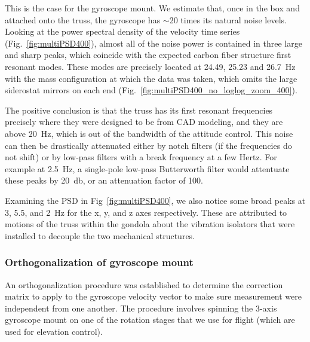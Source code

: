 This is the case for the gyroscope mount. We estimate that, once in the box and attached onto the truss, the gyroscope has $\sim$20 times its natural noise levels. Looking at the power spectral density of the velocity time series (Fig.~\ref{fig:multiPSD400}), almost all of the noise power is contained in three large and sharp peaks, which coincide with the expected carbon fiber structure first resonant modes. These modes are precisely located at 24.49, 25.23 and \SI{26.7}{\hertz} with the mass configuration at which the data was taken, which omits the large siderostat mirrors on each end (Fig.~\ref{fig:multiPSD400_no_loglog_zoom_400}).

The positive conclusion is that the truss has its first resonant frequencies precisely where they were designed to be from CAD modeling, and they are above \SI{20}{\hertz}, which is out of the bandwidth of the attitude control. This noise can then be drastically attenuated either by notch filters (if the frequencies do not shift) or by low-pass filters with a break frequency at a few Hertz. For example at \SI{2.5}{\hertz}, a single-pole low-pass Butterworth filter would attentuate these peaks by \SI{20}{\decibel}, or an attenuation factor of 100. 

Examining the PSD in Fig~\ref{fig:multiPSD400}, we also notice some broad peaks at 3, 5.5, and \SI{2}{\hertz} for the x, y, and z axes respectively. These are attributed to motions of the truss within the gondola about the vibration isolators that were installed to decouple the two mechanical structures. 




\subsubsection{Orthogonalization of gyroscope mount}
\label{ap:gyroOrth}

An orthogonalization procedure was established to determine the correction matrix to apply to the gyroscope velocity vector to make sure measurement were independent from one another. The procedure involves spinning the 3-axis gyroscope mount on one of the rotation stages that we use for flight (which are used for elevation control). 

